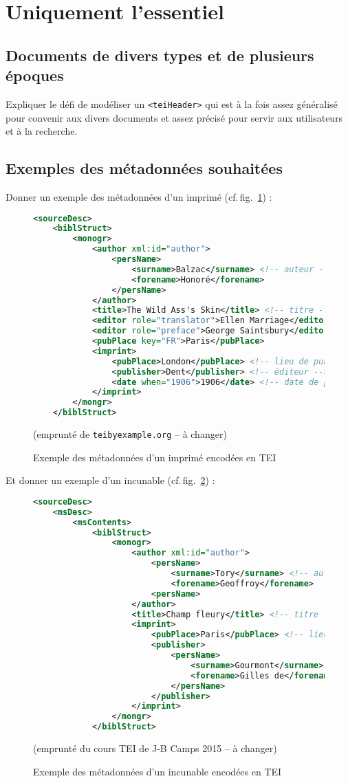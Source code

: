 \documentclass[class=article, crop=false]{standalone}
\begin{document}
\section{Uniquement l'essentiel}

\subsection{Documents de divers types et de plusieurs époques}

Expliquer le défi de modéliser un \texttt{<teiHeader>} qui est à la fois assez généralisé pour convenir aux divers documents et assez précisé pour servir aux utilisateurs et à la recherche.

\subsection{Exemples des métadonnées souhaitées}

Donner un exemple des métadonnées d'un imprimé (cf.\,fig.~\ref{fig:metadata-print}) :

\begin{figure}[ht]
\centering
\begin{lstlisting}[language=XML]
<sourceDesc>
	<biblStruct>
		<monogr>
			<author xml:id="author">
				<persName>
					<surname>Balzac</surname> <!-- auteur -->
					<forename>Honoré</forename>
				</persName>
			</author>
			<title>The Wild Ass's Skin</title> <!-- titre -->
			<editor role="translator">Ellen Marriage</editor>
			<editor role="preface">George Saintsbury</editor>
			<pubPlace key="FR">Paris</pubPlace>
			<imprint>
				<pubPlace>London</pubPlace> <!-- lieu de publication -->
				<publisher>Dent</publisher> <!-- éditeur -->
				<date when="1906">1906</date> <!-- date de publication -->
			</imprint>
		</mongr>
	</biblStruct>
\end{lstlisting}
\caption{Exemple des métadonnées d'un imprimé encodées en TEI}
\centering
(emprunté de \texttt{teibyexample.org} -- à changer)
\label{fig:metadata-print}
\end{figure}

Et donner un exemple d'un incunable (cf.\,fig.~\ref{fig:metadata-incunable})  :

\begin{figure}[ht]
\centering
\begin{lstlisting}[language=XML]
<sourceDesc>
	<msDesc>
		<msContents>
			<biblStruct>
				<monogr>
					<author xml:id="author">
						<persName>
							<surname>Tory</surname> <!-- auteur -->
							<forename>Geoffroy</forename>
						<persName>
					</author>
					<title>Champ fleury</title> <!-- titre -->
					<imprint>
						<pubPlace>Paris</pubPlace> <!-- lieu de publication / lieu d'apparition -->
						<publisher>
							<persName>
								<surname>Gourmont</surname> <!-- éditeur -->
								<forename>Gilles de</forename>
							</persName>
						</publisher>
					</imprint>
				</mongr>
			</biblStruct>			
\end{lstlisting}
\caption{Exemple des métadonnées d'un incunable encodées en TEI}
\centering
(emprunté du cours TEI de J-B Camps 2015 -- à changer)
\label{fig:metadata-incunable}
\end{figure}
\end{document}
